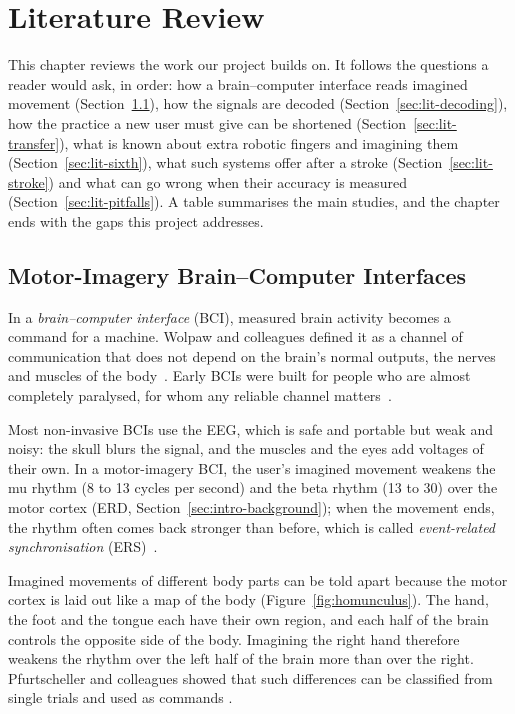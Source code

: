 \chapter{Literature Review}\label{ch:lit}

This chapter reviews the work our project builds on. It follows the questions a reader
would ask, in order: how a brain--computer interface reads imagined movement
(Section~\ref{sec:lit-mi}), how the signals are decoded (Section~\ref{sec:lit-decoding}), how
the practice a new user must give can be shortened (Section~\ref{sec:lit-transfer}), what is
known about extra robotic fingers and imagining them (Section~\ref{sec:lit-sixth}), what such
systems offer after a stroke (Section~\ref{sec:lit-stroke}) and what can go wrong when their
accuracy is measured (Section~\ref{sec:lit-pitfalls}). A table summarises the main studies,
and the chapter ends with the gaps this project addresses.

\section{Motor-Imagery Brain--Computer Interfaces}\label{sec:lit-mi}

In a \emph{brain--computer interface} (BCI), measured brain activity becomes
a command for a machine. Wolpaw and colleagues defined it as a channel of communication
that does not depend on the brain's normal outputs, the nerves and muscles of the
body~\cite{wolpaw2002}. Early BCIs were built for people who are almost completely
paralysed, for whom any reliable channel matters~\cite{kubler2001}.

Most non-invasive BCIs use the EEG, which is safe and portable but weak and noisy: the
skull blurs the signal, and the muscles and the eyes add voltages of their own. In a
motor-imagery BCI, the user's imagined movement weakens the mu rhythm (8 to 13 cycles per
second) and the beta rhythm (13 to 30) over the motor cortex (ERD, Section~\ref{sec:intro-background});
when the movement ends, the rhythm often comes back stronger than before, which is called
\emph{event-related synchronisation} (ERS)~\cite{pfurtscheller1999}.

Imagined movements of different body parts can be told apart because the motor cortex is
laid out like a map of the body (Figure~\ref{fig:homunculus}). The hand, the foot and the
tongue each have their own region, and each half of the brain controls the opposite side of
the body. Imagining the right hand therefore weakens the rhythm over the left half of the
brain more than over the right. Pfurtscheller and colleagues showed that such differences
can be classified from single trials and used as commands
\cite{pfurtscheller2001,pfurtscheller2006}.

